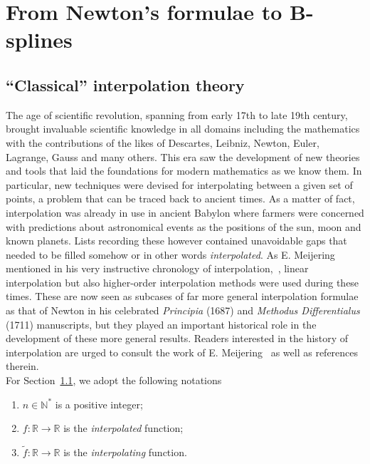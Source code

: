 \chapter{From Newton's formulae to B-splines}\label{chapter1}

\section{``Classical'' interpolation theory}\label{sec:classical} 

The age of scientific revolution, spanning from early 17th to late 19th century, brought invaluable scientific knowledge 
in all domains including the mathematics with the contributions of the likes of Descartes, Leibniz, Newton, Euler, 
Lagrange, Gauss and many others. This era saw the development of new theories and tools that laid the foundations for 
modern mathematics as we know them. In particular, new techniques were devised for interpolating between a given set of 
points, a problem that can be traced back to ancient times. As a matter of fact, interpolation was already in use in 
ancient Babylon where farmers were concerned with predictions about astronomical events as the positions of the sun, 
moon and known planets.  Lists recording these however contained unavoidable gaps that needed to be filled somehow or in 
other words \emph{interpolated}. As E.  Meijering mentioned in his very instructive chronology of 
interpolation,~\cite{meijering_chronology_2002}, linear interpolation but also higher-order interpolation methods were 
used during these times.  These are now seen as subcases of far more general interpolation formulae as that of Newton in 
his celebrated \emph{Principia} (1687) and \emph{Methodus Differentialus} (1711) manuscripts, but they played an 
important historical role in the development of these more general results.  Readers interested in the history of 
interpolation are urged to consult the work of E.  Meijering~\cite{meijering_chronology_2002} as well as references 
therein. \\ 

For Section~\ref{sec:classical}, we adopt the following notations
\begin{enumerate}
  \item $n \in \mathbb{N}^*$ is a positive integer;
  \item $f:\mathbb{R} \to \mathbb{R}$ is the \emph{interpolated} function;
  \item $\tilde{f}:\mathbb{R} \to \mathbb{R}$ is the \emph{interpolating} function.
\end{enumerate}

